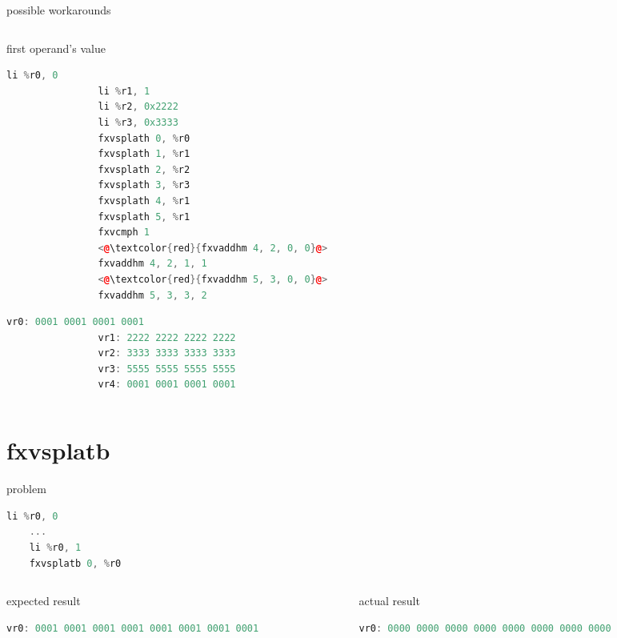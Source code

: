 \documentclass[10pt]{beamer}
\begin{document}
\begin{frame}[fragile]{possible workarounds}{}
\begin{columns}[t]
\begin{column}{0.3\textwidth}
\begin{block}{first operand's value}
    		\begin{lstlisting}[language=C++,basicstyle=\ttfamily\scriptsize,keywordstyle=\color{red}]
				li %r0, 0
				li %r1, 1
				li %r2, 0x2222
				li %r3, 0x3333
				fxvsplath 0, %r0
				fxvsplath 1, %r1
				fxvsplath 2, %r2
				fxvsplath 3, %r3
				fxvsplath 4, %r1
				fxvsplath 5, %r1
				fxvcmph 1
				<@\textcolor{red}{fxvaddhm 4, 2, 0, 0}@>
				fxvaddhm 4, 2, 1, 1
				<@\textcolor{red}{fxvaddhm 5, 3, 0, 0}@>
				fxvaddhm 5, 3, 3, 2
	\end{lstlisting}
      			\begin{lstlisting}[language=C++,basicstyle=\fontsize{5}{7}\selectfont\ttfamily,keywordstyle=\color{red}]
				vr0: 0001 0001 0001 0001
				vr1: 2222 2222 2222 2222
				vr2: 3333 3333 3333 3333
				vr3: 5555 5555 5555 5555
				vr4: 0001 0001 0001 0001
				\end{lstlisting}
			\end{block}
    	\end{column}
	\end{columns}
\end{frame}

\section{fxvsplatb}
\begin{frame}[fragile]{problem}{}
    \begin{lstlisting}[language=C++,basicstyle=\ttfamily\scriptsize,keywordstyle=\color{red}]
	li %r0, 0
	...
	li %r0, 1
	fxvsplatb 0, %r0
	\end{lstlisting}
	\begin{columns}[t]
		\begin{column}{0.4\textwidth}
			\begin{block}{expected result}
      			\begin{lstlisting}[language=C++,basicstyle=\fontsize{5}{7}\selectfont\ttfamily,keywordstyle=\color{red}]
				vr0: 0001 0001 0001 0001 0001 0001 0001 0001
				\end{lstlisting}
			\end{block}
    	\end{column}
    	\begin{column}{0.4\textwidth}
    		\begin{block}{actual result}
      			\begin{lstlisting}[language=C++,basicstyle=\fontsize{5}{7}\selectfont\ttfamily,keywordstyle=\color{red}]
				vr0: 0000 0000 0000 0000 0000 0000 0000 0000
				\end{lstlisting}
			\end{block}
    	\end{column}
	\end{columns}
\end{frame}
\end{document}
